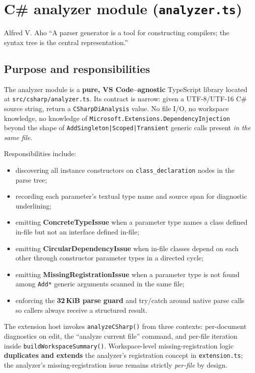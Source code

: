\chapter[C\# analyzer module]{C\# analyzer module (\texttt{analyzer.ts})}
\label{chap3:analyzer}
\begin{chapquote}{Alfred V. Aho}
``A parser generator is a tool for constructing compilers; the syntax tree is the central representation.''
\end{chapquote}

\section{Purpose and responsibilities}
\label{chap3:purpose}

The analyzer module is a \textbf{pure, VS Code--agnostic} TypeScript library located at \texttt{src/csharp/analyzer.ts}. Its contract is narrow: given a UTF-8/UTF-16 C\# source string, return a \texttt{CSharpDiAnalysis} value. No file I/O, no workspace knowledge, no knowledge of \texttt{Microsoft.Extensions.DependencyInjection} beyond the shape of \texttt{AddSingleton|Scoped|Transient} generic calls present \emph{in the same file}.

Responsibilities include:
\begin{itemize}
	\item discovering all instance constructors on \texttt{class\_declaration} nodes in the parse tree;
	\item recording each parameter's textual type name and source span for diagnostic underlining;
	\item emitting \textbf{ConcreteTypeIssue} when a parameter type names a class defined in-file but not an interface defined in-file;
	\item emitting \textbf{CircularDependencyIssue} when in-file classes depend on each other through constructor parameter types in a directed cycle;
	\item emitting \textbf{MissingRegistrationIssue} when a parameter type is not found among \texttt{Add*} generic arguments scanned in the same file;
	\item enforcing the \textbf{32\,KiB parse guard} and try/catch around native parse calls so callers always receive a structured result.
\end{itemize}

The extension host invokes \texttt{analyzeCSharp()} from three contexts: per-document diagnostics on edit, the ``analyze current file'' command, and per-file iteration inside \texttt{buildWorkspaceSummary()}. Workspace-level missing-registration logic \textbf{duplicates and extends} the analyzer's registration concept in \texttt{extension.ts}; the analyzer's missing-registration issue remains strictly \emph{per-file} by design.


